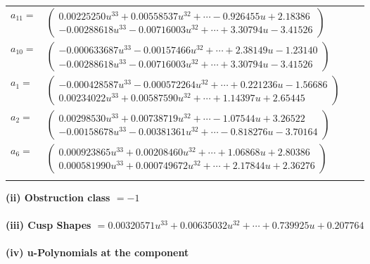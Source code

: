 \documentclass[1p]{elsarticle_modified}
\theoremstyle{definition}
\begin{document}
\begin{tabular}{m{7pt} m{180pt} m{7pt} m{180pt} }
\flushright $a_{11}=$&$\begin{pmatrix}0.00225250 u^{33}+0.00558537 u^{32}+\cdots-0.926455 u+2.18386\\-0.00288618 u^{33}-0.00716003 u^{32}+\cdots+3.30794 u-3.41526\end{pmatrix}$ \\
\flushright $a_{10}=$&$\begin{pmatrix}-0.000633687 u^{33}-0.00157466 u^{32}+\cdots+2.38149 u-1.23140\\-0.00288618 u^{33}-0.00716003 u^{32}+\cdots+3.30794 u-3.41526\end{pmatrix}$ \\
\flushright $a_{1}=$&$\begin{pmatrix}-0.000428587 u^{33}-0.000572264 u^{32}+\cdots+0.221236 u-1.56686\\0.00234022 u^{33}+0.00587590 u^{32}+\cdots+1.14397 u+2.65445\end{pmatrix}$ \\
\flushright $a_{2}=$&$\begin{pmatrix}0.00298530 u^{33}+0.00738719 u^{32}+\cdots-1.07544 u+3.26522\\-0.00158678 u^{33}-0.00381361 u^{32}+\cdots-0.818276 u-3.70164\end{pmatrix}$ \\
\flushright $a_{6}=$&$\begin{pmatrix}0.000923865 u^{33}+0.00208460 u^{32}+\cdots+1.06868 u+2.80386\\0.000581990 u^{33}+0.000749672 u^{32}+\cdots+2.17844 u+2.36276\end{pmatrix}$\\&\end{tabular}
\flushleft \textbf{(ii) Obstruction class $= -1$}\\~\\
\flushleft \textbf{(iii) Cusp Shapes $= 0.00320571 u^{33}+0.00635032 u^{32}+\cdots+0.739925 u+0.207764$}\\~\\
\newpage\renewcommand{\arraystretch}{1}
\flushleft \textbf{(iv) u-Polynomials at the component}\newline \\
\end{document}
